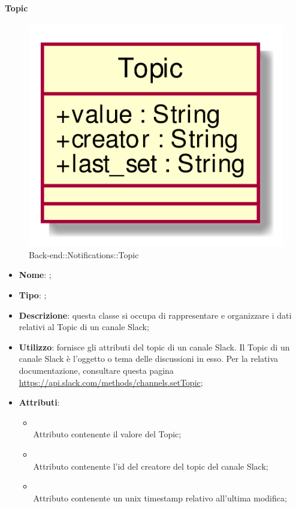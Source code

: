 \hypertarget{Topic_label}{\paragraph{Topic}}
\begin{figure}[h]
	\centering
	\includegraphics[width=\textwidth,height=\textheight,keepaspectratio]{images/ClassTopic.png}
	\caption{Back-end::Notifications::Topic}
\end{figure}
\begin{itemize}
	\item \textbf{Nome}: ;
	\item \textbf{Tipo}: ;
	\item \textbf{Descrizione}: questa classe si occupa di rappresentare e organizzare i dati relativi al Topic di un canale Slack;
	\item \textbf{Utilizzo}: fornisce gli attributi del topic di un canale Slack.
Il Topic di un canale Slack è l'oggetto o tema delle discussioni in esso.
Per la relativa documentazione, consultare questa pagina \url{https://api.slack.com/methods/channels.setTopic};
	\item \textbf{Attributi}:
	\begin{itemize}
		\item[]  \\
		Attributo contenente il valore del Topic;
		\item[]  \\
		Attributo contenente l'id del creatore del topic del canale Slack;
		\item[]  \\
		Attributo contenente un unix timestamp relativo all'ultima modifica;
	\end{itemize}
\end{itemize}

